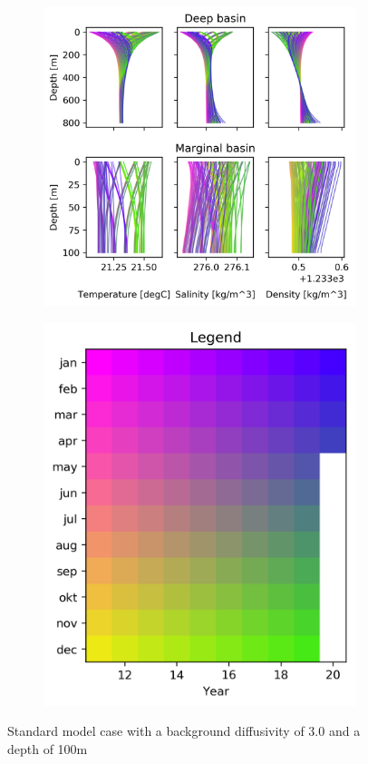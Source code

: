 \documentclass[twocolumn]{article}
\begin{document}
\begin{figure}
\begin{subfigure}[h]{0.7\textwidth}
\centering
\includegraphics[width=\textwidth,keepaspectratio]{hybrid.png}
\end{subfigure}\hfill
\begin{subfigure}[h]{0.20\textwidth}
\centering
\includegraphics[width=1.0\textwidth,keepaspectratio]{Hybrid_Legend.png}
\end{subfigure}\hfill
\caption{Standard model case with a background diffusivity of 3.0 and a depth of 100m}
\label{fig:hybrid}
\end{figure}
\end{document}
